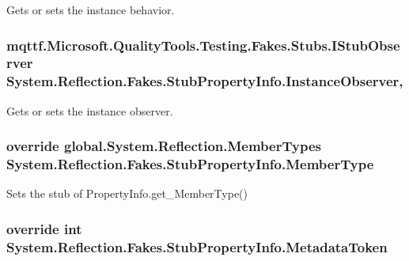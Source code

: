 Gets or sets the instance behavior.

\hypertarget{class_system_1_1_reflection_1_1_fakes_1_1_stub_property_info_a391aace65725772c9e459cdc2eb104ef}{
\subsubsection[{Instance\-Observer}]{\setlength{\rightskip}{0pt plus 5cm}mqttf.\-Microsoft.\-Quality\-Tools.\-Testing.\-Fakes.\-Stubs.\-I\-Stub\-Observer System.\-Reflection.\-Fakes.\-Stub\-Property\-Info.\-Instance\-Observer\hspace{0.3cm}{\ttfamily [get]}, {\ttfamily [set]}}}\label{class_system_1_1_reflection_1_1_fakes_1_1_stub_property_info_a391aace65725772c9e459cdc2eb104ef}


Gets or sets the instance observer.

\hypertarget{class_system_1_1_reflection_1_1_fakes_1_1_stub_property_info_aa3144d75622ae2110d96bec712d59506}{
\subsubsection[{Member\-Type}]{\setlength{\rightskip}{0pt plus 5cm}override global.\-System.\-Reflection.\-Member\-Types System.\-Reflection.\-Fakes.\-Stub\-Property\-Info.\-Member\-Type\hspace{0.3cm}{\ttfamily [get]}}}\label{class_system_1_1_reflection_1_1_fakes_1_1_stub_property_info_aa3144d75622ae2110d96bec712d59506}


Sets the stub of Property\-Info.\-get\-\_\-\-Member\-Type()

\hypertarget{class_system_1_1_reflection_1_1_fakes_1_1_stub_property_info_a1a184836a6106f049d8f5319e290faff}{
\subsubsection[{Metadata\-Token}]{\setlength{\rightskip}{0pt plus 5cm}override int System.\-Reflection.\-Fakes.\-Stub\-Property\-Info.\-Metadata\-Token\hspace{0.3cm}{\ttfamily [get]}}}\label{class_system_1_1_reflection_1_1_fakes_1_1_stub_property_info_a1a184836a6106f049d8f5319e290faff}


